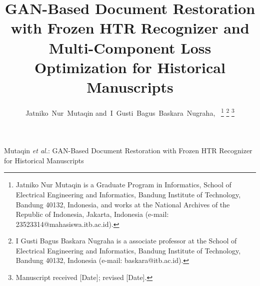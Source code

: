 \documentclass[journal]{IEEEtran}
\begin{document}
% 
\title{GAN-Based Document Restoration with Frozen HTR Recognizer and Multi-Component Loss Optimization for Historical Manuscripts}
% 
\author{Jatniko~Nur~Mutaqin
        and~I~Gusti~Bagus~Baskara~Nugraha,~%
\thanks{Jatniko Nur Mutaqin is a Graduate Program in Informatics, School of Electrical Engineering and Informatics, Bandung Institute of Technology, Bandung 40132, Indonesia, and works at the National Archives of the Republic of Indonesia, Jakarta, Indonesia (e-mail: 23523314@mahasiswa.itb.ac.id).}%
\thanks{I Gusti Bagus Baskara Nugraha is a associate professor at the School of Electrical Engineering and Informatics, Bandung Institute of Technology, Bandung 40132, Indonesia (e-mail: baskara@itb.ac.id).}%
\thanks{Manuscript received [Date]; revised [Date].}}

% 
{Mutaqin \MakeLowercase{\textit{et al.}}: GAN-Based Document Restoration with Frozen HTR Recognizer for Historical Manuscripts}

\maketitle
\end{document}
